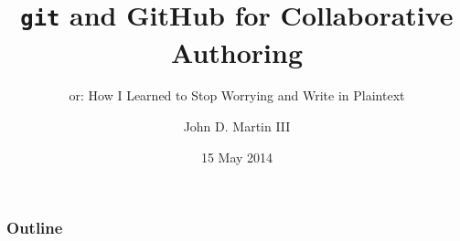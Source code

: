 \documentclass[t]{beamer}
\title{\verb|git| and GitHub for Collaborative Authoring}
\subtitle{or: How I Learned to Stop Worrying and Write in Plaintext}
\author{John D. Martin III}
\institute{University of North Carolina at Chapel Hill}
\date{15 May 2014}
\begin{document}
\begin{frame}
\titlepage
\end{frame}

\begin{frame}
\frametitle{Outline}
\tableofcontents
\end{frame}


\end{document}
